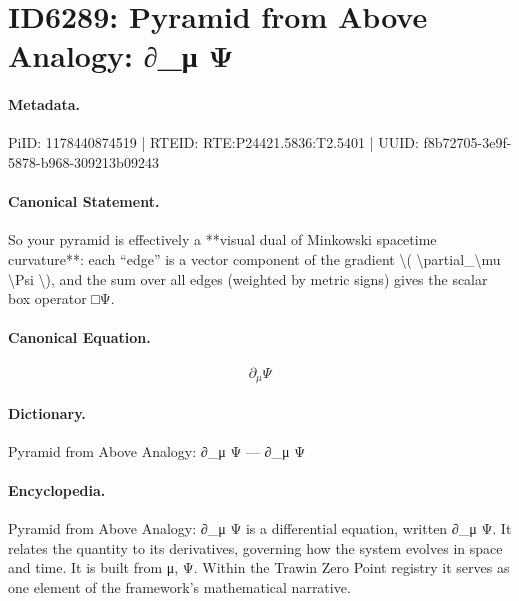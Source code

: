 \section*{ID6289: Pyramid from Above Analogy: ∂\_μ Ψ}
\paragraph{Metadata.}
PiID: 1178440874519 | RTEID: RTE:P24421.5836:T2.5401 | UUID: f8b72705-3e9f-5878-b968-309213b09243

\paragraph{Canonical Statement.}
So your pyramid is effectively a **visual dual of Minkowski spacetime curvature**: each “edge” is a vector component of the gradient \textbackslash{}( \textbackslash{}partial\_\textbackslash{}mu \textbackslash{}Psi \textbackslash{}), and the sum over all edges (weighted by metric signs) gives the scalar box operator □Ψ.

\paragraph{Canonical Equation.}
\[
\partial_\mu \Psi
\]

\paragraph{Dictionary.}
Pyramid from Above Analogy: ∂\_μ Ψ — ∂\_μ Ψ

\paragraph{Encyclopedia.}
Pyramid from Above Analogy: ∂\_μ Ψ is a differential equation, written ∂\_μ Ψ. It relates the quantity to its derivatives, governing how the system evolves in space and time. It is built from μ, Ψ. Within the Trawin Zero Point registry it serves as one element of the framework's mathematical narrative.

